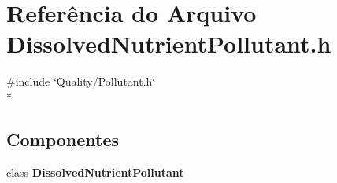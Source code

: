 \section{Referência do Arquivo Dissolved\+Nutrient\+Pollutant.\+h}
\label{_dissolved_nutrient_pollutant_8h}
{\ttfamily \#include \char`\"{}Quality/\+Pollutant.\+h\char`\"{}}\\*
\subsection*{Componentes}
\begin{DoxyCompactItemize}
\item 
class {\bf Dissolved\+Nutrient\+Pollutant}
\end{DoxyCompactItemize}
